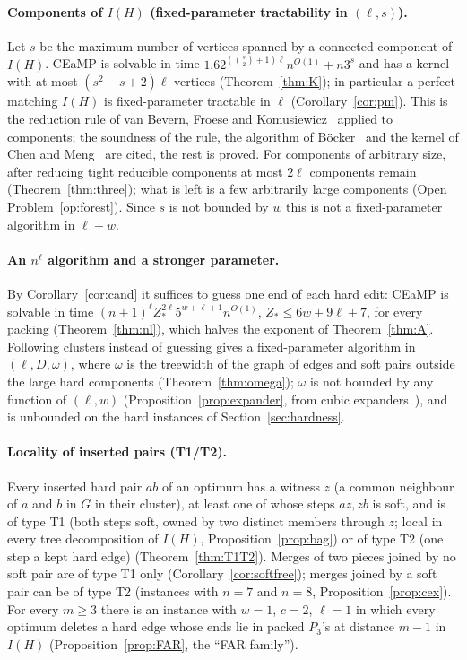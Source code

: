 \paragraph{Components of $I(H)$ (fixed-parameter tractability in $(\ell,s)$).} Let $s$ be the maximum number of vertices spanned by a connected component of $I(H)$. CEaMP is solvable in time $1.62^{(\binom s2+1)\ell}n^{O(1)}+n3^s$ and has a kernel with at most $(s^2-s+2)\ell$ vertices (Theorem~\ref{thm:K}); in particular a perfect matching $I(H)$ is fixed-parameter tractable in $\ell$ (Corollary~\ref{cor:pm}). This is the reduction rule of van Bevern, Froese and Komusiewicz~\cite{BFK18} applied to components; the soundness of the rule, the algorithm of B\"ocker~\cite{Boe12} and the kernel of Chen and Meng~\cite{CM12} are cited, the rest is proved. For components of arbitrary size, after reducing tight reducible components at most $2\ell$ components remain (Theorem~\ref{thm:three}); what is left is a few arbitrarily large components (Open Problem~\ref{op:forest}). Since $s$ is not bounded by $w$ this is not a fixed-parameter algorithm in $\ell+w$.

\paragraph{An $n^{\ell}$ algorithm and a stronger parameter.} By Corollary~\ref{cor:cand} it suffices to guess one end of each hard edit: CEaMP is solvable in time $(n+1)^{\ell}Z_*^{2\ell}5^{w+\ell+1}n^{O(1)}$, $Z_*\le6w+9\ell+7$, for every packing (Theorem~\ref{thm:nl}), which halves the exponent of Theorem~\ref{thm:A}. Following clusters instead of guessing gives a fixed-parameter algorithm in $(\ell,D,\omega)$, where $\omega$ is the treewidth of the graph of edges and soft pairs outside the large hard components (Theorem~\ref{thm:omega}); $\omega$ is not bounded by any function of $(\ell,w)$ (Proposition~\ref{prop:expander}, from cubic expanders~\cite{GM09}), and is unbounded on the hard instances of Section~\ref{sec:hardness}.

\paragraph{Locality of inserted pairs (T1/T2).} Every inserted hard pair $ab$ of an optimum has a witness $z$ (a common neighbour of $a$ and $b$ in $G$ in their cluster), at least one of whose steps $az,zb$ is soft, and is of type T1 (both steps soft, owned by two distinct members through $z$; local in every tree decomposition of $I(H)$, Proposition~\ref{prop:bag}) or of type T2 (one step a kept hard edge) (Theorem~\ref{thm:T1T2}). Merges of two pieces joined by no soft pair are of type T1 only (Corollary~\ref{cor:softfree}); merges joined by a soft pair can be of type T2 (instances with $n=7$ and $n=8$, Proposition~\ref{prop:cex}). For every $m\ge3$ there is an instance with $w=1$, $c=2$, $\ell=1$ in which every optimum deletes a hard edge whose ends lie in packed $P_3$'s at distance $m-1$ in $I(H)$ (Proposition~\ref{prop:FAR}, the ``FAR family'').


